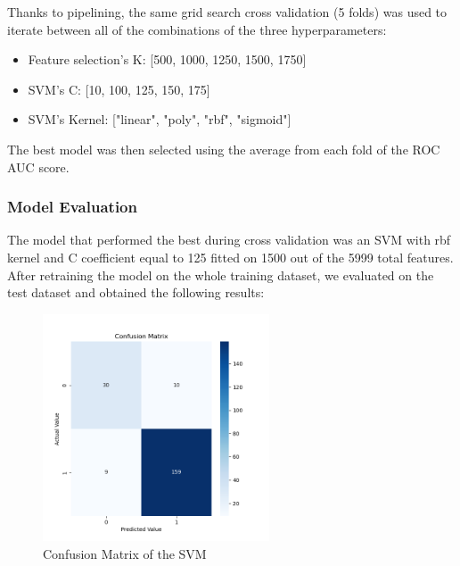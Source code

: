 \documentclass{article}
\begin{document}
Thanks to pipelining, the same grid search cross validation (5 folds) was used to iterate between all of the combinations of the three hyperparameters:
 
\begin{itemize}
  \item Feature selection's K: [500, 1000, 1250, 1500, 1750]
  \item SVM's C: [10, 100, 125, 150, 175]
  \item SVM's Kernel: ["linear", "poly", "rbf", "sigmoid"]
\end{itemize}

The best model was then selected using the average from each fold of the ROC AUC score. 

\subsubsection{Model Evaluation}

The model that performed the best during cross validation was an SVM with rbf kernel and C coefficient equal to 125 fitted on 1500 out of the 5999 total features. After retraining the model on the whole training dataset, we evaluated on the test dataset and obtained the following results:

\begin{figure}[h]
	\centering
	\includegraphics[width=0.6\textwidth]{confusion_matrix_SVM.png}
	 \vspace{-1em}
	\caption{Confusion Matrix of the SVM}
\end{figure}
\end{document}
